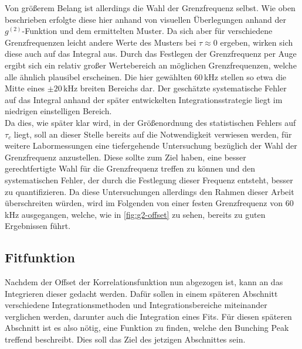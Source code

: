 Von größerem Belang ist allerdings die Wahl der Grenzfrequenz selbst. 
Wie oben beschrieben erfolgte diese hier anhand von visuellen Überlegungen anhand der $g^{(2)}$-Funktion und dem ermittelten Muster. 
Da sich aber für verschiedene Grenzfrequenzen leicht andere Werte des Musters bei $\tau\approx 0$ ergeben, wirken sich diese auch auf das Integral aus. 
Durch das Festlegen der Grenzfrequenz per Auge ergibt sich ein relativ großer Wertebereich an möglichen Grenzfrequenzen, welche alle ähnlich plausibel erscheinen. 
Die hier gewählten 60\,kHz stellen so etwa die Mitte eines $\pm20\,\mathrm{kHz}$ breiten Bereichs dar. 
Der geschätzte systematische Fehler auf das Integral anhand der später entwickelten Integrationsstrategie liegt im niedrigen einstelligen Bereich. \\

Da dies, wie später klar wird, in der Größenordnung des statistischen Fehlers auf $\tau_c$ liegt, soll an dieser Stelle bereits auf die Notwendigkeit verwiesen werden, für weitere Labormessungen eine tiefergehende Untersuchung bezüglich der Wahl der Grenzfrequenz anzustellen. 
Diese sollte zum Ziel haben, eine besser gerechtfertigte Wahl für die Grenzfrequenz treffen zu können und den systematischen Fehler, der durch die Festlegung dieser Frequenz entsteht, besser zu quantifizieren. 
Da diese Untersuchungen allerdings den Rahmen dieser Arbeit überschreiten würden, wird im Folgenden von einer festen Grenzfrequenz von 60\,kHz ausgegangen, welche, wie in \autoref{fig:g2-offset} zu sehen, bereits zu guten Ergebnissen führt. 

\subsection{Fitfunktion}
\label{ssec:Fitfunktion}    
Nachdem der Offset der Korrelationsfunktion nun abgezogen ist, kann an das Integrieren dieser gedacht werden. 
Dafür sollen in einem späteren Abschnitt verschiedene Integrationsmethoden und Integrationsbereiche miteinander verglichen werden, darunter auch die Integration eines Fits. 
Für diesen späteren Abschnitt ist es also nötig, eine Funktion zu finden, welche den Bunching Peak treffend beschreibt. 
Dies soll das Ziel des jetzigen Abschnittes sein. 

